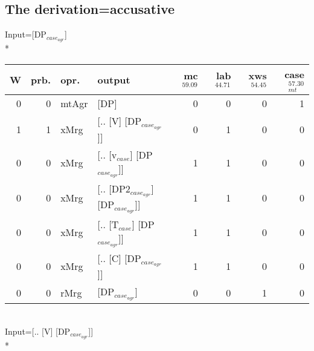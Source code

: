 \subsection{The derivation=accusative}
\begingroup\scriptsize Input=[DP$_{case_{agr}}$]\\*
\begin{tabularx}{\linewidth}{rrlXrrrr}
\hline
   W &   prb. & opr.    & output                            &   mc$^{59.09}$ &   lab$^{44.71}$ &   xws$^{54.45}$ &   case$_{mt}^{57.30}$ \\
\hline
   0 &   0 & mtAgr & [DP]                              &            0 &             0 &             0 &                 1 \\
   1 &   1 & xMrg  & [.. [V] [DP$_{case_{agr}}$]]            &            0 &             1 &             0 &                 0 \\
   0 &   0 & xMrg  & [.. [v$_{case}$] [DP$_{case_{agr}}$]]       &            1 &             1 &             0 &                 0 \\
   0 &   0 & xMrg  & [.. [DP2$_{case_{agr}}$] [DP$_{case_{agr}}$]] &            1 &             1 &             0 &                 0 \\
   0 &   0 & xMrg  & [.. [T$_{case}$] [DP$_{case_{agr}}$]]       &            1 &             1 &             0 &                 0 \\
   0 &   0 & xMrg  & [.. [C] [DP$_{case_{agr}}$]]            &            1 &             1 &             0 &                 0 \\
   0 &   0 & rMrg  & [DP$_{case_{agr}}$]                     &            0 &             0 &             1 &                 0 \\
\hline
\end{tabularx}\endgroup\\
\begingroup\scriptsize Input=[.. [V] [DP$_{case_{agr}}$]]\\*

